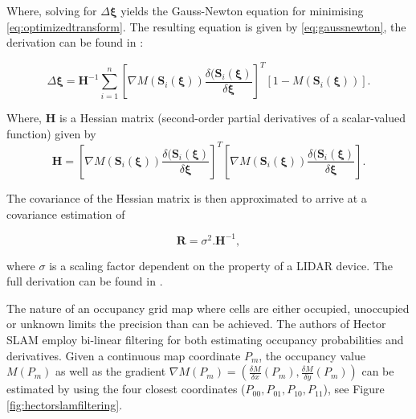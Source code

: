 Where, solving for $\Delta\boldsymbol{\xi}$ yields the Gauss-Newton equation for minimising \ref{eq:optimizedtransform}. The resulting equation is given by \ref{eq:gaussnewton}, the derivation can be found in \cite{Kohlbrecher2011a}: 

\begin{equation}
    \Delta\boldsymbol{\xi} = \mathbf{H}^{-1} \sum_{i=1}^{n}[\nabla{M}(\mathbf{S}_i(\boldsymbol{\xi}))\frac{\delta{(\mathbf{S}_i(\boldsymbol{\xi})}}{\delta{\boldsymbol{\xi}}}]^T [1-M(\mathbf{S}_i(\boldsymbol{\xi}))].
\label{eq:gaussnewton}
\end{equation}

Where, $\mathbf{H}$ is a Hessian matrix (second-order partial derivatives of a scalar-valued function) given by
\begin{equation}
	\mathbf{H} = [\nabla{M}(\mathbf{S}_i(\boldsymbol{\xi}))\frac{\delta{(\mathbf{S}_i(\boldsymbol{\xi})}}{\delta{\boldsymbol{\xi}}}]^T [\nabla{M}(\mathbf{S}_i(\boldsymbol{\xi}))\frac{\delta{(\mathbf{S}_i(\boldsymbol{\xi})}}{\delta{\boldsymbol{\xi}}}].
	\label{eq:hessian}
\end{equation}

The covariance of the Hessian matrix is then approximated to arrive at a covariance estimation of

\begin{equation}
    \mathbf{R} = \sigma^2.\mathbf{H}^{-1},
\end{equation}

where $\sigma$ is a scaling factor dependent on the property of a LIDAR device. The full derivation can be found in \cite{Burguera2009}. 

The nature of an occupancy grid map where cells are either occupied, unoccupied or unknown limits the precision than can be achieved. The authors of Hector SLAM employ bi-linear filtering for both estimating occupancy probabilities and derivatives. Given a continuous map coordinate $P_m$, the occupancy value $M(P_m)$ as well as the gradient $\nabla{M}(P_m) = (\frac{\delta{M}}{\delta{x}}(P_m), \frac{\delta{M}}{\delta{y}}(P_m))$ can be estimated by using the four closest coordinates ($P_{00},P_{01}, P_{10},P_{11} $), see Figure \ref{fig:hectorslamfiltering}.

